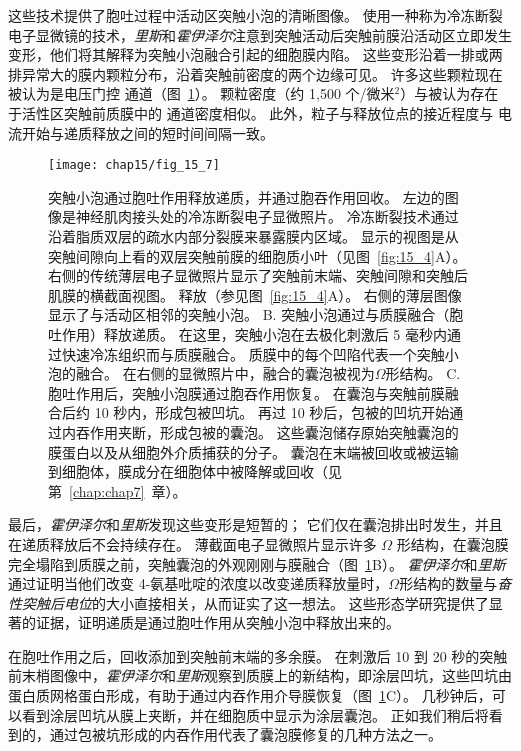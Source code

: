 这些技术提供了胞吐过程中活动区突触小泡的清晰图像。 
使用一种称为冷冻断裂电子显微镜的技术，\textit{里斯}和\textit{霍伊泽尔}注意到突触活动后突触前膜沿活动区立即发生变形，他们将其解释为突触小泡融合引起的细胞膜内陷。 
这些变形沿着一排或两排异常大的膜内颗粒分布，沿着突触前密度的两个边缘可见。
许多这些颗粒现在被认为是电压门控  通道（图~\ref{fig:15_7}）。
颗粒密度（约 1,500 个/微米$ ^2 $）与被认为存在于活性区突触前质膜中的  通道密度相似。
此外，粒子与释放位点的接近程度与  电流开始与递质释放之间的短时间间隔一致。


\begin{figure}[htbp]
	\centering
	\texttt{[image: chap15/fig\_15\_7]}
	\caption{突触小泡通过胞吐作用释放递质，并通过胞吞作用回收。
		左边的图像是神经肌肉接头处的冷冻断裂电子显微照片。
		冷冻断裂技术通过沿着脂质双层的疏水内部分裂膜来暴露膜内区域。
		显示的视图是从突触间隙向上看的双层突触前膜的细胞质小叶（见图~\ref{fig:15_4}A）。
		右侧的传统薄层电子显微照片显示了突触前末端、突触间隙和突触后肌膜的横截面视图\cite{heuser1981structural}。
		释放（参见图~\ref{fig:15_4}A）。
		右侧的薄层图像显示了与活动区相邻的突触小泡。
		B. 突触小泡通过与质膜融合（胞吐作用）释放递质。
		在这里，突触小泡在去极化刺激后 5 毫秒内通过快速冷冻组织而与质膜融合。
		质膜中的每个凹陷代表一个突触小泡的融合。
		在右侧的显微照片中，融合的囊泡被视为$\Omega$形结构。
		C. 胞吐作用后，突触小泡膜通过胞吞作用恢复。
		在囊泡与突触前膜融合后约 10 秒内，形成包被凹坑。
		再过 10 秒后，包被的凹坑开始通过内吞作用夹断，形成包被的囊泡。
		这些囊泡储存原始突触囊泡的膜蛋白以及从细胞外介质捕获的分子。
		囊泡在末端被回收或被运输到细胞体，膜成分在细胞体中被降解或回收（见第~\ref{chap:chap7}~章）。}
	\label{fig:15_7}
\end{figure}



最后，\textit{霍伊泽尔}和\textit{里斯}发现这些变形是短暂的；
它们仅在囊泡排出时发生，并且在递质释放后不会持续存在。
薄截面电子显微照片显示许多 $\Omega$ 形结构，在囊泡膜完全塌陷到质膜之前，突触囊泡的外观刚刚与膜融合（图~\ref{fig:15_7}B）。
\textit{霍伊泽尔}和\textit{里斯}通过证明当他们改变 4-氨基吡啶的浓度以改变递质释放量时，$\Omega$形结构的数量与\textit{奋性突触后电位}的大小直接相关，从而证实了这一想法。
这些形态学研究提供了显著的证据，证明递质是通过胞吐作用从突触小泡中释放出来的。


在胞吐作用之后，回收添加到突触前末端的多余膜。
在刺激后 10 到 20 秒的突触前末梢图像中，\textit{霍伊泽尔}和\textit{里斯}观察到质膜上的新结构，即涂层凹坑，这些凹坑由蛋白质网格蛋白形成，有助于通过内吞作用介导膜恢复（图~\ref{fig:15_7}C）。
几秒钟后，可以看到涂层凹坑从膜上夹断，并在细胞质中显示为涂层囊泡。
正如我们稍后将看到的，通过包被坑形成的内吞作用代表了囊泡膜修复的几种方法之一。



